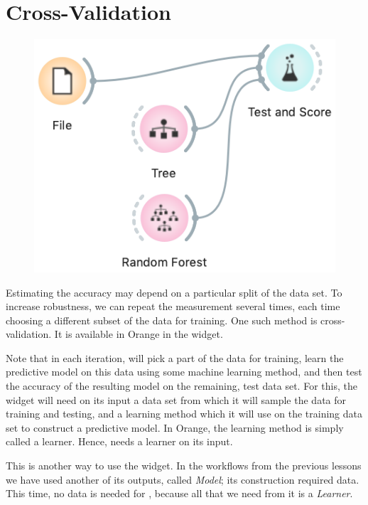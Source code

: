 \chapter{Cross-Validation}

\begin{figure}
    \vspace{-0.5cm}
    \includegraphics[scale=0.4]{workflow.png}
\end{figure}

Estimating the accuracy may depend on a particular split of the data set. To increase robustness, we can repeat the measurement several times, each time choosing a different subset of the data for training. One such method is cross-validation. It is available in Orange in the  widget.

Note that in each iteration,  will pick a part of the data for training, learn the predictive model on this data using some machine learning method, and then test the accuracy of the resulting model on the remaining, test data set. For this, the widget will need on its input a data set from which it will sample the data for training and testing, and a learning method which it will use on the training data set to construct a predictive model. In Orange, the learning method is simply called a learner. Hence,  needs a learner on its input. 

This is another way to use the  widget. In the workflows from the previous lessons we have used another of its outputs, called \textit{Model}; its construction required data. This time, no data is needed for , because all that we need from it is a \textit{Learner}.

